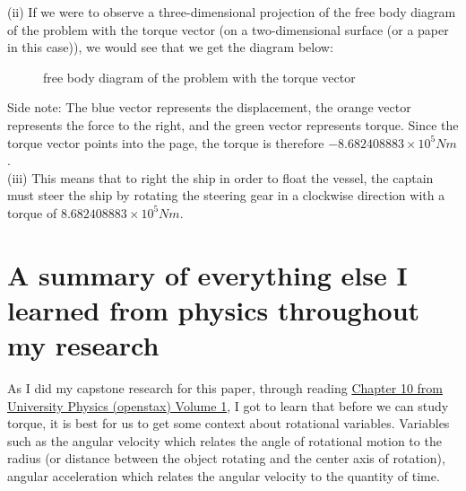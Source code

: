 \documentclass{turabian-researchpaper}
\begin{document}
(ii)  If we were to observe a three-dimensional projection of the free body diagram of the problem with the torque vector (on a two-dimensional surface (or a paper in this case)), we would see that we get the diagram below: \\ 

\begin{figure}[H] 
    \centering
    \caption{ free body diagram of the problem with the torque vector}
    \label{fig:Problem-FBD3}
\end{figure} 

Side note: The blue vector represents the displacement, the orange vector represents the force to the right, and the green vector represents torque. Since the torque vector points into the page, the torque is therefore \(-8.682408883 \times 10^5 Nm\). \\ 

(iii) This means that to right the ship in order to float the vessel, the captain must steer the ship by rotating the steering gear in a clockwise direction with a torque of \(8.682408883 \times 10^5 Nm\). \\ 

\section*{A summary of everything else I learned from physics throughout my research} 

As I did my capstone research for this paper, through reading \href{https://openstax.org/books/university-physics-volume-1/pages/10-introduction}{Chapter 10 from University Physics (openstax) Volume 1}, I got to learn that before we can study torque, it is best for us to get some context about rotational variables. Variables such as the angular velocity which relates the angle of rotational motion to the radius (or distance between the object rotating and the center axis of rotation), angular acceleration which relates the angular velocity to the quantity of time. \\ 
\end{document}

